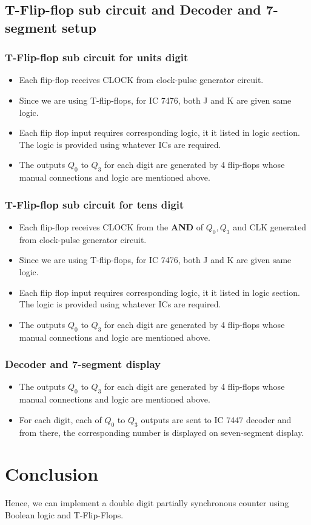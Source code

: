 \documentclass[a4paper,12pt]{article}
\begin{document}
\subsection{T-Flip-flop sub circuit and Decoder and 7-segment setup}

\subsubsection{T-Flip-flop sub circuit for units digit}
\begin{itemize}
    \item Each flip-flop receives CLOCK from clock-pulse generator circuit.
    \item Since we are using T-flip-flops, for IC 7476, both J and K are given same logic.
    \item Each flip flop input requires corresponding logic, it it listed in logic section. The logic is provided using whatever ICs are required.
    \item The outputs $Q_0$ to $Q_3$ for each digit are generated by 4 flip-flops whose manual connections and logic are mentioned above.
\end{itemize}

\subsubsection{T-Flip-flop sub circuit for tens digit}
\begin{itemize}
    \item Each flip-flop receives CLOCK from the \textbf{AND} of $Q_0,Q_3$ and CLK generated from clock-pulse generator circuit.
    \item Since we are using T-flip-flops, for IC 7476, both J and K are given same logic.
    \item Each flip flop input requires corresponding logic, it it listed in logic section. The logic is provided using whatever ICs are required.
    \item The outputs $Q_0$ to $Q_3$ for each digit are generated by 4 flip-flops whose manual connections and logic are mentioned above.
\end{itemize}

\subsubsection{Decoder and 7-segment display}
\begin{itemize}
    \item The outputs $Q_0$ to $Q_3$ for each digit are generated by 4 flip-flops whose manual connections and logic are mentioned above.
    \item For each digit, each of $Q_0$ to $Q_3$ outputs are sent to IC 7447 decoder and from there, the corresponding number is displayed on seven-segment display.
\end{itemize}

\section{Conclusion}
Hence, we can implement a double digit partially synchronous counter using Boolean logic and T-Flip-Flops.
\end{document}
